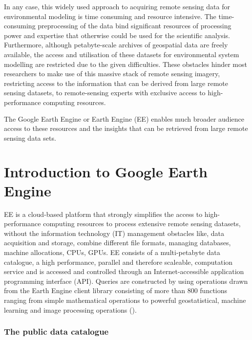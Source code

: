 In any case, this widely used approach to acquiring remote sensing data for environmental modeling is time consuming and resource intensive.
The time-consuming preprocessing of the data bind significant resources of processing power and expertise that otherwise could be used for the scientific analysis. Furthermore, although petabyte-scale archives of geospatial data are freely available, the access and utilisation of these datasets for environmental system modelling are restricted due to the given difficulties. 
These obstacles hinder most researchers to make use of this massive stack of remote sensing imagery, restricting access to the information that can be derived from large remote sensing datasets, to remote-sensing experts with exclusive access to high-performance computing resources.

The Google Earth Engine or Earth Engine (EE) enables much broader audience access to these resources and the insights that can be retrieved from large remote sensing data sets.

\section{Introduction to Google Earth Engine}

EE is a cloud-based platform that strongly simplifies the access to high-performance computing resources to process extensive remote sensing datasets, without the information technology (IT) management obstacles like, data acquisition and storage, combine different file formats, managing databases, machine allocations, CPUs, GPUs. 
EE consists of a multi-petabyte data catalogue, a high performance, parallel and therefore scaleable, computation service and is accessed and controlled through an Internet-accessible application programming interface (API). Queries are constructed by using operations drawn from the Earth Engine client library consisting of more than 800 functions ranging from simple mathematical operations to powerful geostatistical, machine learning and image processing operations (\cite{gorelick2017google}).

\subsubsection{The public data catalogue}

